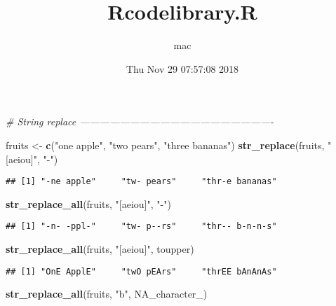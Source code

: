 \documentclass[]{article}
\title{Rcodelibrary.R}
\author{mac}
\date{Thu Nov 29 07:57:08 2018}
\newenvironment{Shaded}{\begin{snugshade}}{\end{snugshade}}
\newcommand{\KeywordTok}[1]{\textcolor[rgb]{0.13,0.29,0.53}{\textbf{#1}}}
\newcommand{\StringTok}[1]{\textcolor[rgb]{0.31,0.60,0.02}{#1}}
\newcommand{\CommentTok}[1]{\textcolor[rgb]{0.56,0.35,0.01}{\textit{#1}}}
\newcommand{\OtherTok}[1]{\textcolor[rgb]{0.56,0.35,0.01}{#1}}
\newcommand{\NormalTok}[1]{#1}
\begin{document}
\maketitle

\begin{Shaded}
\begin{Highlighting}[]
\CommentTok{# String replace ----------------------------------------------------------}


\NormalTok{fruits <-}\StringTok{ }\KeywordTok{c}\NormalTok{(}\StringTok{"one apple"}\NormalTok{, }\StringTok{"two pears"}\NormalTok{, }\StringTok{"three bananas"}\NormalTok{)}
\KeywordTok{str_replace}\NormalTok{(fruits, }\StringTok{"[aeiou]"}\NormalTok{, }\StringTok{"-"}\NormalTok{)}
\end{Highlighting}
\end{Shaded}

\begin{verbatim}
## [1] "-ne apple"     "tw- pears"     "thr-e bananas"
\end{verbatim}

\begin{Shaded}
\begin{Highlighting}[]
\KeywordTok{str_replace_all}\NormalTok{(fruits, }\StringTok{"[aeiou]"}\NormalTok{, }\StringTok{"-"}\NormalTok{)}
\end{Highlighting}
\end{Shaded}

\begin{verbatim}
## [1] "-n- -ppl-"     "tw- p--rs"     "thr-- b-n-n-s"
\end{verbatim}

\begin{Shaded}
\begin{Highlighting}[]
\KeywordTok{str_replace_all}\NormalTok{(fruits, }\StringTok{"[aeiou]"}\NormalTok{, toupper)}
\end{Highlighting}
\end{Shaded}

\begin{verbatim}
## [1] "OnE ApplE"     "twO pEArs"     "thrEE bAnAnAs"
\end{verbatim}

\begin{Shaded}
\begin{Highlighting}[]
\KeywordTok{str_replace_all}\NormalTok{(fruits, }\StringTok{"b"}\NormalTok{, }\OtherTok{NA_character_}\NormalTok{)}
\end{Highlighting}
\end{Shaded}
\end{document}
